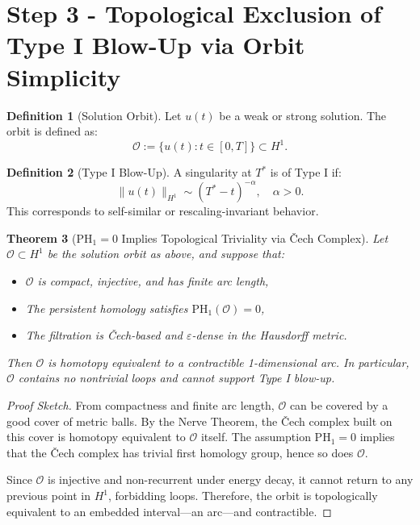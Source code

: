 \documentclass[11pt]{article}
\newtheorem{theorem}{Theorem}[section]
\theoremstyle{definition}
\newtheorem{definition}[theorem]{Definition}
\begin{document}
\section{Step 3 - Topological Exclusion of Type I Blow-Up via Orbit Simplicity}


\begin{definition}[Solution Orbit]
Let $u(t)$ be a weak or strong solution. The orbit is defined as:
\[ \mathcal{O} := \{ u(t) : t \in [0,T] \} \subset H^1. \]
\end{definition}

\begin{definition}[Type I Blow-Up]
A singularity at $T^*$ is of Type I if:
\[ \|u(t)\|_{H^1} \sim (T^* - t)^{-\alpha}, \quad \alpha > 0. \]
This corresponds to self-similar or rescaling-invariant behavior.
\end{definition}

\begin{theorem}[PH$_1 = 0$ Implies Topological Triviality via Čech Complex]
\label{thm:ph1_cech_contractibility}
Let $\mathcal{O} \subset H^1$ be the solution orbit as above, and suppose that:
\begin{itemize}
  \item $\mathcal{O}$ is compact, injective, and has finite arc length,
  \item The persistent homology satisfies $\mathrm{PH}_1(\mathcal{O}) = 0$,
  \item The filtration is Čech-based and $\varepsilon$-dense in the Hausdorff metric.
\end{itemize}
Then $\mathcal{O}$ is homotopy equivalent to a contractible 1-dimensional arc. In particular, $\mathcal{O}$ contains no nontrivial loops and cannot support Type I blow-up.
\end{theorem}

\begin{proof}[Proof Sketch]
From compactness and finite arc length, $\mathcal{O}$ can be covered by a good cover of metric balls. By the Nerve Theorem, the Čech complex built on this cover is homotopy equivalent to $\mathcal{O}$ itself. The assumption $\mathrm{PH}_1 = 0$ implies that the Čech complex has trivial first homology group, hence so does $\mathcal{O}$.

Since $\mathcal{O}$ is injective and non-recurrent under energy decay, it cannot return to any previous point in $H^1$, forbidding loops. Therefore, the orbit is topologically equivalent to an embedded interval—an arc—and contractible.
\end{proof}
\end{document}
